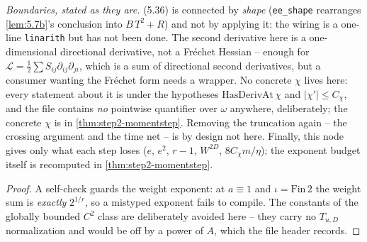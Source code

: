 \begin{lemma}
  \emph{Boundaries, stated as they are.}  (5.36) is connected by \emph{shape}
  (\texttt{ee\_shape} rearranges \ref{lem:5.7b}'s conclusion into $B\,T^2+R$) and not by applying
  it: the wiring is a one-line \texttt{linarith} but has not been done.  The second derivative
  here is a one-dimensional directional derivative, not a Fr\'echet Hessian -- enough for
  $\mathcal L=\tfrac12\sum S_{ij}\partial_{ij}\partial_{ji}$, which is a sum of directional second
  derivatives, but a consumer wanting the Fr\'echet form needs a wrapper.  No concrete $\chi$
  lives here: every statement about it is under the hypotheses $\mathrm{HasDerivAt}\,\chi$ and
  $|\chi'|\le C_\chi$, and the file contains \emph{no} pointwise quantifier over $\omega$
  anywhere, deliberately; the concrete $\chi$ is in \ref{thm:step2-momentstep}.  Removing the
  truncation again -- the crossing argument and the time net -- is by design not here.  Finally,
  this node gives only what each step loses ($e$, $e^2$, $r-1$, $W^{2D}$, $8C_\chi m/\eta$); the
  exponent budget itself is recomputed in \ref{thm:step2-momentstep}.
\end{lemma}
\begin{proof}\leanok
  A self-check guards the weight exponent: at $a\equiv1$ and $\iota=\mathrm{Fin}\,2$ the weight sum
  is \emph{exactly} $2^{1/r}$, so a mistyped exponent fails to compile.  The constants of the
  globally bounded $C^2$ class are deliberately avoided here -- they carry no $T_{u,D}$
  normalization and would be off by a power of $A$, which the file header records.
\end{proof}

